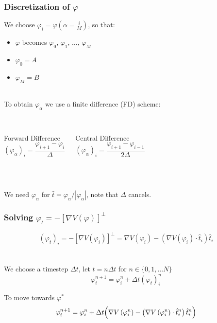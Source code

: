 \documentclass{beamer}
\renewcommand{\phi}{\varphi}
\renewcommand{\(}{\left(}
\renewcommand{\)}{\right)}
\newcommand{\dt}{\Delta t}
\begin{document}
\begin{frame}
\frametitle{Discretization of $\phi$}
We choose $\phi_i = \phi(\alpha = \frac{i}{M})$, so that:
\begin{itemize}
\item $\phi$ becomes $\phi_0$, $\phi_1$, $\dots$, $\phi_M$
\item  $\phi_0 = A$
\item $\phi_M = B$
\end{itemize}
~\\
To obtain $\phi_\alpha$ we use a finite difference (FD) scheme:\\
~\\
\begin{columns}[c]
\begin{block}{Forward Difference}
$$(\phi_\alpha)_i = \frac{\phi_{i+1}-\phi_i}{\Delta}$$
\end{block}
\begin{block}{Central Difference}
$$(\phi_\alpha)_i = \frac{\phi_{i+1}-\phi_{i-1}}{2\Delta}$$
\end{block}%
\end{columns}
~\\
~\\
We need $\phi_\alpha$ for $\hat t = \phi_\alpha / |\phi_\alpha|$, note that $\Delta$ cancels.
\end{frame}

\begin{frame}
\frametitle{Solving $\phi_t=-[\nabla V(\phi)]^\bot$}
$$(\phi_t)_i=-[\nabla V(\phi_i)]^\bot = \nabla V(\phi_i) - (\nabla V(\phi_i) \cdot \hat t_i)\hat t_i$$\\~\\
We choose a timestep $\dt$, let $t=n\dt$ for $n\in\{0, 1, \dots N\}$\\
$$\phi_i^{n+1} = \phi_i^n+\dt(\phi_t)_i^n$$
\begin{block}{To move towards $\phi^*$}
$$\phi_i^{n+1} = \phi_i^n+\dt\Big{(}\nabla V\(\phi_i^n\) - \(\nabla V\(\phi_i^n\) \cdot \hat t_i^n\)\hat t_i^n\Big{)}$$
\end{block}
\end{frame}
\end{document}
